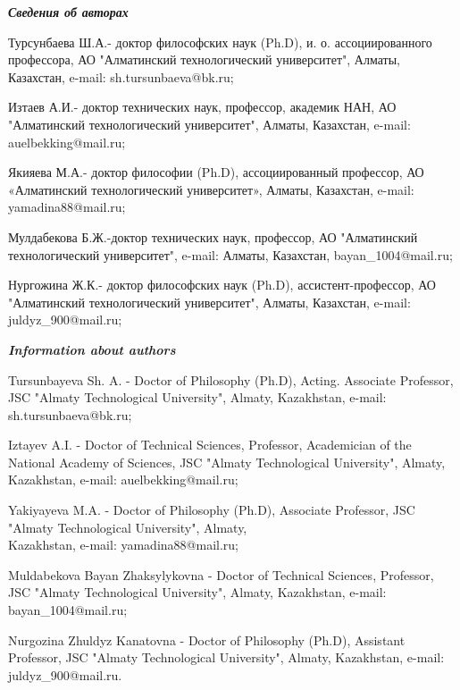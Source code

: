 \begin{authorinfo}
\emph{{\bfseries Сведения об авторах}}

Турсунбаева Ш.А.- доктор философских наук (Ph.D), и. о. ассоциированного
профессора, АО "Алматинский технологический университет", Алматы,
Казахстан, e-mail: sh.tursunbaeva@bk.ru;

Изтаев А.И.- доктор технических наук, профессор, академик НАН, АО
"Алматинский технологический университет", Алматы, Казахстан, e-mail:
auelbekking@mail.ru;

Якияева М.А.- доктор философии (Ph.D), ассоциированный профессор, АО
«Алматинский технологический университет», Алматы, Казахстан, e-mail:
yamadina88@mail.ru;

Мулдабекова Б.Ж.-доктор технических наук, профессор, АО "Алматинский
технологический университет", e-mail: Алматы, Казахстан, bayan\_1004@mail.ru;

Нургожина Ж.К.- доктор философских наук (Ph.D), ассистент-профессор, АО
"Алматинский технологический университет", Алматы, Казахстан, e-mail:
juldyz\_900@mail.ru;

\emph{{\bfseries Information about authors}}

Tursunbayeva Sh. A. - Doctor of Philosophy (Ph.D), Acting. Associate
Professor, JSC "Almaty Technological University", Almaty, Kazakhstan,
e-mail: sh.tursunbaeva@bk.ru;

Iztayev A.I. - Doctor of Technical Sciences, Professor, Academician of
the National Academy of Sciences, JSC "Almaty Technological University",
Almaty, Kazakhstan, e-mail: auelbekking@mail.ru;

Yakiyayeva M.A. - Doctor of Philosophy (Ph.D), Associate Professor, JSC
"Almaty Technological University", Almaty, \\Kazakhstan, e-mail:
yamadina88@mail.ru;

Muldabekova Bayan Zhaksylykovna - Doctor of Technical Sciences,
Professor, JSC "Almaty Technological University", Almaty, Kazakhstan, e-mail:
bayan\_1004@mail.ru;

Nurgozina Zhuldyz Kanatovna - Doctor of Philosophy (Ph.D), Assistant
Professor, JSC "Almaty Technological University", Almaty, Kazakhstan,
e-mail: juldyz\_900@mail.ru.
\end{authorinfo}
